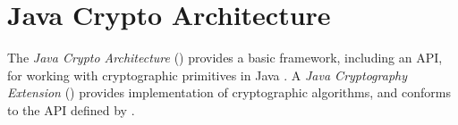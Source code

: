 



\section{Java Crypto Architecture} \label{section:pre:jca}

The \textit{Java Crypto Architecture} () provides a basic framework, including an API, for working with cryptographic primitives in Java \cite{JCA}.
A \textit{Java Cryptography Extension} () provides implementation of cryptographic algorithms, and conforms to the API defined by .

